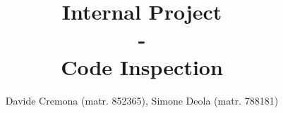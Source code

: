 \documentclass{report}
\begin{document}
\title{\textbf{Internal Project} \\-\\ \textbf{Code Inspection}}
\author{Davide Cremona (matr. 852365), Simone Deola (matr. 788181)}
 
\maketitle

\tableofcontents










 
\end{document}
